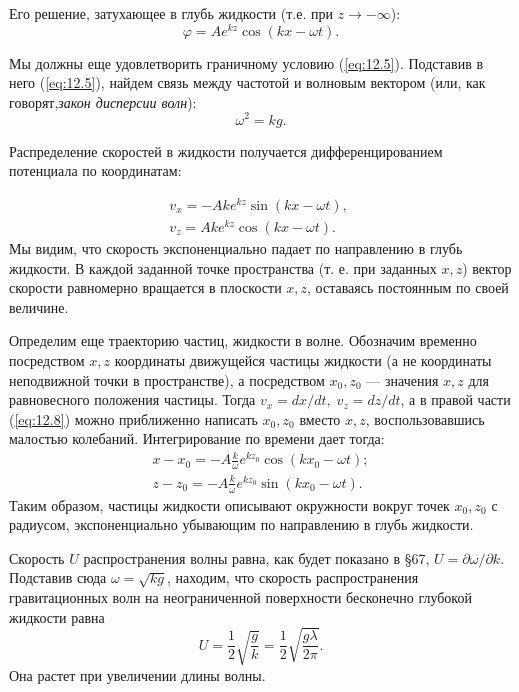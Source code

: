 Его решение, затухающее в глубь жидкости (т.е. при $z \to - \infty$):
\begin{equation}
 \label{eq:12.6}
   \varphi = Ae^{kz}\cos (kx - \omega t).
\end{equation}

Мы должны еще удовлетворить граничному условию (\ref{eq:12.5}). Подставив в него (\ref{eq:12.5}),
найдем связь между частотой и волновым вектором (или, как говорят,\textit{закон
дисперсии волн}):
\begin{equation}
 \label{eq:12.7}
   \omega^2 = kg.
\end{equation}

Распределение скоростей в жидкости получается дифференцированием потенциала по
координатам:

\begin{equation}
 \label{eq:12.8}
\begin{array}{l}
   v_x = -Ake^{kz}\sin (kx - \omega t),\; \\
   v_z =  Ake^{kz}\cos (kx - \omega t).
\end{array}
\end{equation}
Мы видим, что скорость экспоненциально падает по направлению в глубь жидкости. В
каждой заданной точке пространства (т. е. при заданных $x,z$) вектор скорости
равномерно вращается в плоскости $x,z$, оставаясь постоянным по своей величине.

Определим еще траекторию частиц, жидкости в волне. Обозначим временно
посредством $x,z$ координаты движущейся частицы жидкости (а не координаты
неподвижной точки в пространстве), а посредством $x_0,z_0$ — значения $x,z$ для
равновесного положения частицы. Тогда $v_x = dx/dt,\; v_z = dz/dt$, а в правой
части (\ref{eq:12.8}) можно приближенно написать $x_0, z_0$ вместо $x,z$,
воспользовавшись малостью колебаний. Интегрирование по времени дает тогда:
\begin{equation}
 \label{eq:12.9}
\begin{array}{l}
   x - x_0 = - A \frac{k}{\omega}e^{kz_0} \cos (kx_0 - \omega t); \\
   z - z_0 = - A \frac{k}{\omega}e^{kz_0} \sin (kx_0 - \omega t).
\end{array}
\end{equation}
Таким образом, частицы жидкости описывают окружности вокруг точек $x_0, z_0$ с
радиусом, экспоненциально убывающим по направлению в глубь жидкости.

Скорость $U$ распространения волны равна, как будет показано в \S67, $U =
\partial \omega/\partial k$. Подставив сюда $\omega = \sqrt{kg}$, находим, что
скорость распространения гравитационных волн на неограниченной поверхности
бесконечно глубокой жидкости равна
\begin{equation}
 \label{eq:12.10}
   U = \frac{1}{2}\sqrt{\frac{g}{k}}=\frac{1}{2}\sqrt{\frac{g\lambda}{2\pi}}.
\end{equation}
Она растет при увеличении длины волны.

